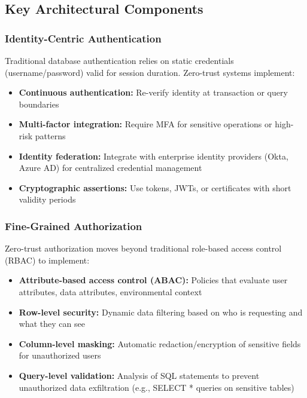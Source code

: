 \subsection{Key Architectural Components}

\subsubsection{Identity-Centric Authentication}

Traditional database authentication relies on static credentials (username/password) valid for session duration. Zero-trust systems implement:

\begin{itemize}
    \item \textbf{Continuous authentication:} Re-verify identity at transaction or query boundaries
    \item \textbf{Multi-factor integration:} Require MFA for sensitive operations or high-risk patterns
    \item \textbf{Identity federation:} Integrate with enterprise identity providers (Okta, Azure AD) for centralized credential management
    \item \textbf{Cryptographic assertions:} Use tokens, JWTs, or certificates with short validity periods
\end{itemize}

\subsubsection{Fine-Grained Authorization}

Zero-trust authorization moves beyond traditional role-based access control (RBAC) to implement:

\begin{itemize}
    \item \textbf{Attribute-based access control (ABAC):} Policies that evaluate user attributes, data attributes, environmental context
    \item \textbf{Row-level security:} Dynamic data filtering based on who is requesting and what they can see
    \item \textbf{Column-level masking:} Automatic redaction/encryption of sensitive fields for unauthorized users
    \item \textbf{Query-level validation:} Analysis of SQL statements to prevent unauthorized data exfiltration (e.g., SELECT * queries on sensitive tables)
\end{itemize}

